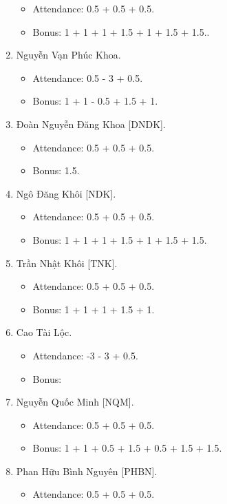 \documentclass{article}
\begin{document}
\begin{enumerate}
    \begin{itemize}
        \item Attendance: 0.5 + 0.5 + 0.5.
        \item Bonus: 1 + 1 + 1 + 1.5 + 1 + 1.5 + 1.5..
    \end{itemize}
    \item {\sc Nguyễn Vạn Phúc Khoa.}
    \begin{itemize}
        \item Attendance: 0.5 - 3 + 0.5.
        \item Bonus: 1 + 1 - 0.5 + 1.5 + 1.
    \end{itemize}
    \item {\sc Đoàn Nguyễn Đăng Khoa [DNDK].}
    \begin{itemize}
        \item Attendance: 0.5 + 0.5 + 0.5.
        \item Bonus: 1.5.
    \end{itemize}
    \item {\sc Ngô Đăng Khôi [NDK].}
    \begin{itemize}
        \item Attendance: 0.5 + 0.5 + 0.5.
        \item Bonus: 1 + 1 + 1 + 1.5 + 1 + 1.5 + 1.5.
    \end{itemize}
    \item {\sc Trần Nhật Khôi [TNK].}
    \begin{itemize}
        \item Attendance: 0.5 + 0.5 + 0.5.
        \item Bonus: 1 + 1 + 1 + 1.5 + 1.
    \end{itemize}
    \item {\sc Cao Tài Lộc.}
    \begin{itemize}
        \item Attendance: -3 - 3 + 0.5.
        \item Bonus:
    \end{itemize}
    \item {\sc Nguyễn Quốc Minh [NQM].}
    \begin{itemize}
        \item Attendance: 0.5 + 0.5 + 0.5.
        \item Bonus: 1 + 1 + 0.5 + 1.5 + 0.5 + 1.5 + 1.5.
    \end{itemize}
    \item {\sc Phan Hữu Bình Nguyên [PHBN].}
    \begin{itemize}
        \item Attendance: 0.5 + 0.5 + 0.5.

\end{itemize}
\end{enumerate}
\end{document}
